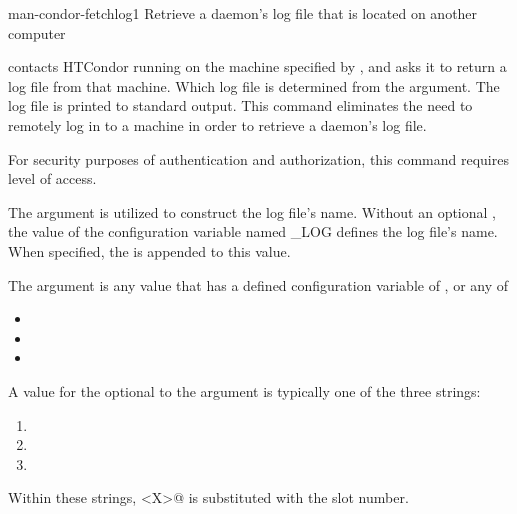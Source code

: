 \begin{ManPage}{}{man-condor-fetchlog}{1}
{Retrieve a daemon's log file that is located on another computer}


\Synopsis 
{}
\ToolArgsBase


\Description 

 contacts HTCondor running on the machine specified by
, and asks it to return a log file from that
machine.  Which log file is determined from
the  argument.
The log file is printed to standard output.
This command eliminates the need to remotely log in to a
machine in order to retrieve a daemon's log file.

For security purposes of authentication and authorization, 
this command requires  level of access.

The  argument is utilized to construct
the log file's name.
Without an optional ,
the value of the configuration variable named \_LOG 
defines the log file's name.
When specified, the  is appended to this value.

The  argument is any value 
that has a defined configuration variable of
, or any of
\begin{itemize}
\item {}
\item {}
\item {}
\end{itemize}

A value for the optional  to the  argument
is typically one of the three strings:
\begin{enumerate}
\item{}
\item{}
\item{}
\end{enumerate}
Within these strings, \verb@<X>@ is substituted with the slot number.
 

\end{ManPage}
